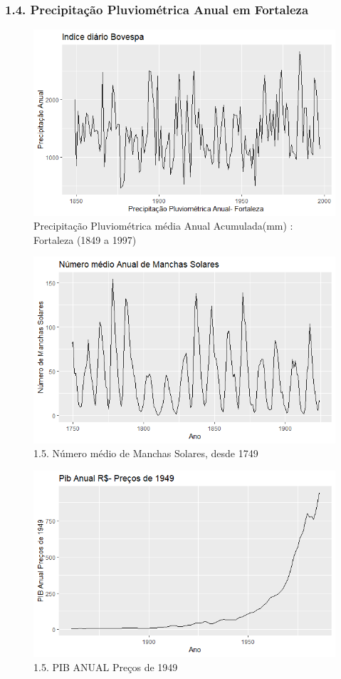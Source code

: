 \documentclass{beamer}
\begin{document}
	\begin{frame}
		\frametitle{1.4. Precipitação Pluviométrica Anual em Fortaleza}
		\begin{figure}
			\centering
			\caption{Precipitação Pluviométrica média Anual Acumulada(mm) : Fortaleza (1849 a 1997)}
			\label{fig:fortaleza}
			\includegraphics[width=0.7\linewidth]{apresentacao_series_temporais/images/Fortaleza}
		\end{figure}
	\end{frame}

	\begin{frame}
		\begin{figure}
			\centering
			\caption{1.5. Número médio de Manchas Solares, desde 1749}
			\label{fig:manchas}
			\includegraphics[width=0.7\linewidth]{apresentacao_series_temporais/images/manchas}
		\end{figure}
	\end{frame}

	\begin{frame}
		\begin{figure}
			\centering
			\caption{1.5. PIB ANUAL Preços de 1949}
			\label{fig:pib}
			\includegraphics[width=0.7\linewidth]{apresentacao_series_temporais/images/pib}
		\end{figure}
	\end{frame}
\end{document}
